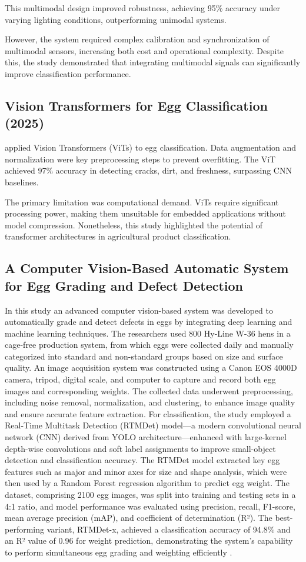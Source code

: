 \documentclass[conference]{IEEEtran}
\begin{document}
	This multimodal design improved robustness, achieving 95\% accuracy under varying lighting conditions, outperforming unimodal systems.  
	
	However, the system required complex calibration and synchronization of multimodal sensors, increasing both cost and operational complexity. Despite this, the study demonstrated that integrating multimodal signals can significantly improve classification performance.
	
	\subsection{Vision Transformers for Egg Classification (2025)}
	\cite{huang2025vit} applied Vision Transformers (ViTs) to egg classification. Data augmentation and normalization were key preprocessing steps to prevent overfitting. The ViT achieved 97\% accuracy in detecting cracks, dirt, and freshness, surpassing CNN baselines.  
	
	The primary limitation was computational demand. ViTs require significant processing power, making them unsuitable for embedded applications without model compression. Nonetheless, this study highlighted the potential of transformer architectures in agricultural product classification.
	
	\subsection{A Computer Vision-Based Automatic System for Egg Grading and Defect Detection}
	In this study an advanced computer vision-based system was developed to automatically grade and detect defects in eggs by integrating deep learning and machine learning techniques. The researchers used 800 Hy-Line W-36 hens in a cage-free production system, from which eggs were collected daily and manually categorized into standard and non-standard groups based on size and surface quality. An image acquisition system was constructed using a Canon EOS 4000D camera, tripod, digital scale, and computer to capture and record both egg images and corresponding weights. The collected data underwent preprocessing, including noise removal, normalization, and clustering, to enhance image quality and ensure accurate feature extraction. For classification, the study employed a Real-Time Multitask Detection (RTMDet) model—a modern convolutional neural network (CNN) derived from YOLO architecture—enhanced with large-kernel depth-wise convolutions and soft label assignments to improve small-object detection and classification accuracy. The RTMDet model extracted key egg features such as major and minor axes for size and shape analysis, which were then used by a Random Forest regression algorithm to predict egg weight. The dataset, comprising 2100 egg images, was split into training and testing sets in a 4:1 ratio, and model performance was evaluated using precision, recall, F1-score, mean average precision (mAP), and coefficient of determination (R²). The best-performing variant, RTMDet-x, achieved a classification accuracy of 94.8\% and an R² value of 0.96 for weight prediction, demonstrating the system’s capability to perform simultaneous egg grading and weighting efficiently \cite{yang2023eggGrading}.
	
\end{document}
